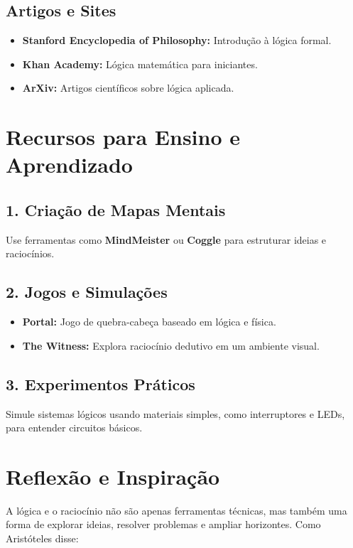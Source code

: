 \documentclass[a4paper,12pt]{book}
\begin{document}
\subsection*{Artigos e Sites}
\begin{itemize}
    \item \textbf{Stanford Encyclopedia of Philosophy:} Introdução à lógica formal.
    \item \textbf{Khan Academy:} Lógica matemática para iniciantes.
    \item \textbf{ArXiv:} Artigos científicos sobre lógica aplicada.
\end{itemize}

\section{Recursos para Ensino e Aprendizado}

\subsection*{1. Criação de Mapas Mentais}
Use ferramentas como \textbf{MindMeister} ou \textbf{Coggle} para estruturar ideias e raciocínios.

\subsection*{2. Jogos e Simulações}
\begin{itemize}
    \item \textbf{Portal:} Jogo de quebra-cabeça baseado em lógica e física.
    \item \textbf{The Witness:} Explora raciocínio dedutivo em um ambiente visual.
\end{itemize}

\subsection*{3. Experimentos Práticos}
Simule sistemas lógicos usando materiais simples, como interruptores e LEDs, para entender circuitos básicos.

\section{Reflexão e Inspiração}
A lógica e o raciocínio não são apenas ferramentas técnicas, mas também uma forma de explorar ideias, resolver problemas e ampliar horizontes. Como Aristóteles disse:
\end{document}
